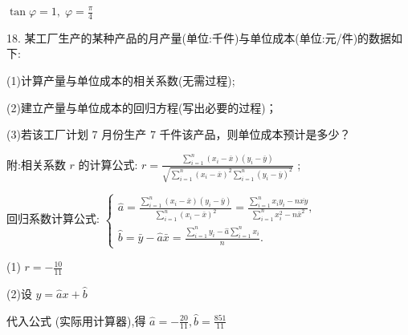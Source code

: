 \documentclass[10pt]{article}
\begin{document}
\(\tan \varphi  = 1,\;\varphi  = \frac{\pi }{4}\)

18. 某工厂生产的某种产品的月产量(单位:千件)与单位成本(单位:元/件)的数据如下:

\begin{center}
\end{center}

(1)计算产量与单位成本的相关系数(无需过程);

(2)建立产量与单位成本的回归方程(写出必要的过程)；

(3)若该工厂计划 7 月份生产 7 千件该产品，则单位成本预计是多少？

附:相关系数 \(r\) 的计算公式: \(r = \frac{\mathop{\sum }\limits_{{i = 1}}^{n}\left( {{x}_{i} - \overline{x}}\right) \left( {{y}_{i} - \overline{y}}\right) }{\sqrt{\mathop{\sum }\limits_{{i = 1}}^{n}{\left( {x}_{i} - \overline{x}\right) }^{2}\mathop{\sum }\limits_{{i = 1}}^{n}{\left( {y}_{i} - \overline{y}\right) }^{2}}}\) ;

回归系数计算公式: \(\left\{  \begin{array}{l} \widehat{a} = \frac{\mathop{\sum }\limits_{{i = 1}}^{n}\left( {{x}_{i} - \bar{x}}\right) \left( {{y}_{i} - \bar{y}}\right) }{\mathop{\sum }\limits_{{i = 1}}^{n}{\left( {x}_{i} - \bar{x}\right) }^{2}} = \frac{\mathop{\sum }\limits_{{i = 1}}^{n}{x}_{i}{y}_{i} - n\overline{xy}}{\mathop{\sum }\limits_{{i = 1}}^{n}{x}_{i}^{2} - n{\bar{x}}^{2}}, \\  \widehat{b} = \bar{y} - \widehat{a}\bar{x} = \frac{\mathop{\sum }\limits_{{i = 1}}^{n}{y}_{i} - \widehat{a}\mathop{\sum }\limits_{{i = 1}}^{n}{x}_{i}}{n}. \end{array}\right.\)

(1) \(r =  - \frac{10}{11}\)

(2)设 \(\widehat{y} = \widehat{a}x + \widehat{b}\)

代入公式 (实际用计算器),得 \(\widehat{a} =  - \frac{20}{11},\widehat{b} = \frac{851}{11}\)
\end{document}
